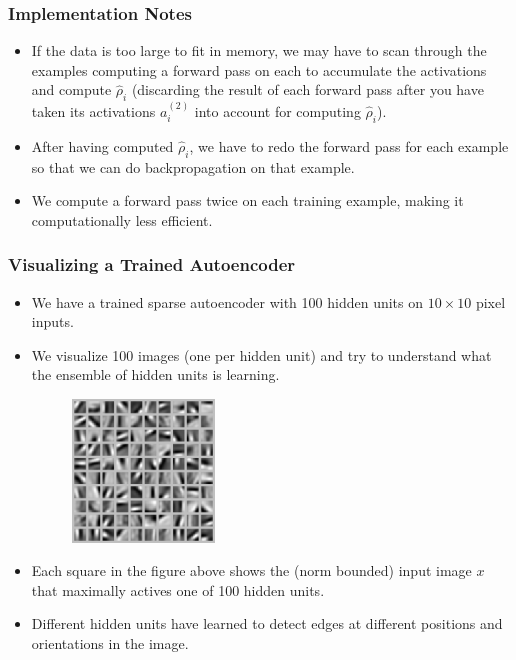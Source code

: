 \documentclass{beamer}
\begin{document}
\begin{frame}
\frametitle{Implementation Notes}
\begin{itemize}
\item If the data is too large to fit in memory, we may have to scan through the examples computing a forward pass on each to accumulate the activations and compute $\hat\rho_i$ (discarding the result of each forward pass after you have taken its activations $a^{(2)}_i$ into account for computing $\hat\rho_i$). 
\item After having computed $\hat\rho_i$, we have to redo the forward pass for each example so that we can do backpropagation on that example. 
\item We compute a forward pass twice on each training example, making it computationally less efficient.
\end{itemize}
\end{frame}

\begin{frame}
\frametitle{Visualizing a Trained Autoencoder}
\begin{itemize}
\item We have a trained sparse autoencoder with 100 hidden units on $10 \times 10$ pixel inputs.

\item We visualize 100 images (one per hidden unit) and try to understand what the ensemble of hidden units is learning.
\begin{figure}
      \includegraphics[height=3.8cm]{figs/ExampleSparseAutoencoderWeights.png}
\end{figure}

\item Each square in the figure above shows the (norm bounded) input image $x$ that maximally actives one of 100 hidden units. 

\item Different hidden units have learned to detect edges at different positions and orientations in the image.
\end{itemize}
\end{frame}
\end{document}
